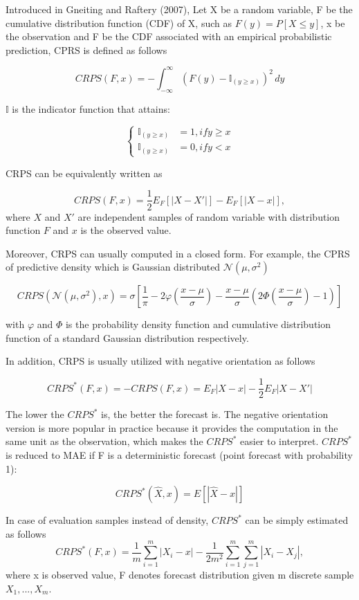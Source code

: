 \documentclass[12pt,a4paper]{article}
\numberwithin{equation}{section}
\begin{document}
Introduced in Gneiting and  Raftery (2007), Let X be a random variable, F be the cumulative distribution function (CDF) of X, such as $F(y) = P [X \leq y]$, x be the observation and F be the CDF associated with an empirical probabilistic prediction, CPRS is defined as follows

\[CRPS(F,x) = - \int_{-\infty}^{\infty}  (F(y) - \mathbb{I}_{(y \geq x)}) ^2 \,dy\]

$\mathbb{I}$ is the indicator function that attains:

\begin{equation*}
\begin{cases}
\mathbb{I}_{(y \geq x)} &= 1, if y \geq x\\
\mathbb{I}_{(y \geq x)} &= 0, if y < x
\end{cases}
\end{equation*}

CRPS can be equivalently written as 

\[CRPS(F, x) =  \frac{1}{2} E_F [|X-X'|] - E_F [|X-x|],\]
 where $X$ and $X'$ are independent samples of random variable with distribution function $F$ and $x$ is the observed value.
 
 Moreover, CRPS can usually computed in a closed form. For example, the CPRS of predictive density which is Gaussian distributed $\mathcal{N}(\mu, \sigma^2)$
 
 
 \[CRPS(\mathcal{N}(\mu, \sigma^2), x) = \sigma\left[\frac{1}{\pi} - 2 \varphi \left( \frac{x-\mu}{\sigma} \right) - \frac{x-\mu}{\sigma} \left( 2 \Phi \left( \frac{x-\mu}{\sigma} \right) -1 \right)\right]\]
 
 with $\varphi$ and $\Phi$ is the probability density function and cumulative distribution function of a standard Gaussian distribution respectively. 
 
In addition, CRPS is usually utilized with negative orientation as follows

\[CRPS^*(F, x) = - CRPS(F, x) = E_F |X-x| - \frac{1}{2} E_F |X-X'|\]

The lower the $CRPS^*$ is, the better the forecast is. The negative orientation version is more popular in practice because it provides the computation in the same unit as the observation, which makes the $CRPS^*$ easier to interpret. $CRPS^*$ is reduced to MAE if F is a deterministic forecast (point forecast with probability 1):

\[CRPS^*(\hat{X}, x) = E[ | \hat{X} - x | ]\] 

In case of evaluation samples instead of density, $CRPS^*$ can be simply estimated as follows
\[ CRPS^*(F, x) = \frac{1}{m} \sum_{i = 1}^{m} | X_i - x | - \frac{1}{2m^2} \sum_{i = 1}^{m} \sum_{j = 1}^{m} | X_i - X_j |,\]
 where x is observed value, F denotes forecast distribution given m discrete sample $X_1, ..., X_m$.
 
\end{document}

